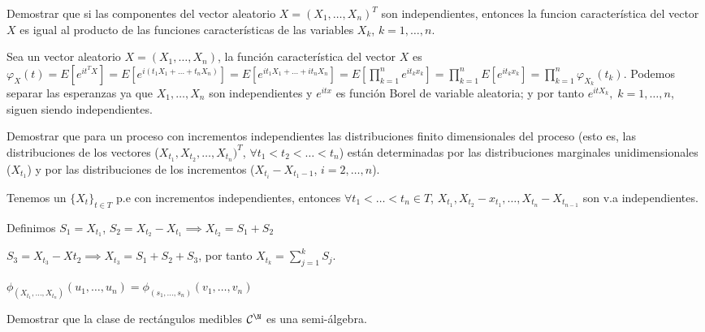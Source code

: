 \begin{ejer}
  Demostrar que si las componentes del vector aleatorio $X = (X_1, \ldots, X_n)^T$ son independientes, entonces la funcion característica del vector $X$ es igual al producto de las funciones características de las variables $X_k$, $k = 1, \ldots, n$.
\end{ejer}

\begin{sol}
  Sea un vector aleatorio $X = (X_1, \ldots, X_n)$, la función característica del vector $X$ es $\varphi_X(t) = E[e^{it^TX}] = E[e^{i(t_1 X_1 + \ldots + t_n X_n)}] = E[e^{i t_1 X_1 + \ldots + i t_n X_n}] = E[\prod \limits^n_{k = 1} e^{i t_k x_k}] = \prod \limits^n_{k = 1} E[e^{i t_k x_k}] = \prod \limits^n_{k = 1} \varphi_{X_k} (t_k)$. Podemos separar las esperanzas ya que $X_1, \ldots, X_n$ son independientes y $e^{itx}$ es función Borel de variable aleatoria; y por tanto $e^{itX_k}, \; k = 1, \ldots, n$, siguen siendo independientes.
\end{sol}

\begin{ejer}
  Demostrar que para un proceso con incrementos independientes las distribuciones finito dimensionales del proceso (esto es, las distribuciones de los vectores ($X_{t_1}, X_{t_2}, \ldots, X_{t_n})^T$, $\forall t_1 < t_2 < \ldots < t_n$) están determinadas por las distribuciones marginales unidimensionales ($X_{t_1}$) y por las distribuciones de los incrementos ($X_{t_i} - X_{t_1 - 1}$, $i = 2, \ldots, n$).
\end{ejer}

\begin{sol}
  Tenemos un $\{X_t\}_{t \in T}$ p.e con incrementos independientes, entonces $\forall t_1 < \ldots < t_n \in T$, $X_{t_1}, X_{t_2} - x_{t_1}, \ldots, X_{t_n} - X_{t_{n-1}}$ son v.a independientes.

  Definimos $S_1 = X_{t_1}$, $S_2 = X_{t_2} - X_{t_1} \implies X_{t_2} = S_1 + S_2$

  $S_3 = X_{t_3} - X{t_2} \implies X_{t_3} = S_1 + S_2 + S_3$, por tanto $X_{t_k} = \sum \limits^k_{j = 1} S_j$.

  $\phi_{(X_{t_1}, \ldots, X_{t_n})}(u_1, \ldots, u_n) = \phi_{(s_1, \ldots, s_n)}(v_1, \ldots, v_n)$

\end{sol}

\begin{ejer}
  Demostrar que la clase de rectángulos medibles $\mathcal{C}^\N$ es una semi-álgebra.
\end{ejer}

